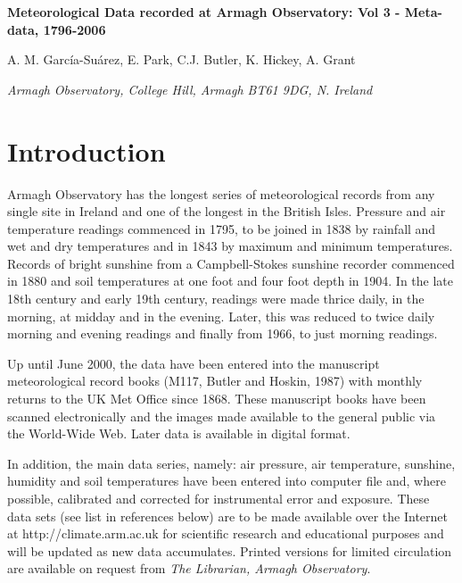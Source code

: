 \documentclass[12pt, epsfig, graphics, rotating, epsf,tifff]{article}
\begin{document}
\begin{center}

\vspace{-5mm}\LARGE{\bf Meteorological Data recorded at Armagh Observatory:
Vol 3 - Meta-data, 1796-2006}

\vspace{5mm}

\normalsize
{A. M. Garc\'{i}a-Su\'{a}rez, E. Park, C.J. Butler, K. Hickey, A. Grant}


{\em Armagh Observatory, College Hill, Armagh BT61 9DG, N. Ireland}
\end{center}
	
\vspace{-0.5cm}
\section{Introduction}

Armagh Observatory has the longest series of meteorological records from any
single site in Ireland and one of the longest in the British Isles. Pressure
and air temperature readings commenced in 1795, to be joined in 1838 by
rainfall and wet and dry temperatures and in 1843 by maximum and
minimum temperatures. Records of bright sunshine from a
Campbell-Stokes sunshine recorder commenced in 1880 and soil temperatures at
one foot and four foot depth in 1904. In the late 18th century and early 19th
century, readings were made thrice daily, in the morning, at midday and in the
evening. Later, this was reduced to twice daily morning and evening readings
and finally from 1966, to just morning readings.

\medskip

Up until June 2000, the data have been entered into the manuscript meteorological 
record books (M117, Butler and Hoskin, 1987) with monthly returns to the UK Met
Office since 1868. These manuscript books have been scanned electronically and
the images made available to the general public via the World-Wide Web. Later
data is available in digital format.

\medskip

In addition, the main data series, namely: air pressure, air temperature,
sunshine, humidity and soil temperatures have been entered into computer file
and, where possible, calibrated and corrected for instrumental error and
exposure. These data sets (see list in references below) are to be made
available over the Internet at http://climate.arm.ac.uk for scientific research
and educational purposes and will be updated as new data accumulates. Printed
versions for limited circulation are available on request from {\em The
Librarian, Armagh Observatory}.
\end{document}
